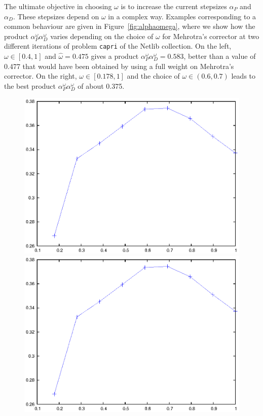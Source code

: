 The ultimate objective in choosing $\omega$ is to increase 
the current stepsizes 
$\alpha_P$ and $\alpha_D$. These stepsizes depend on $\omega$ 
in a complex way. Examples corresponding to a common behaviour 
are given in Figure~\ref{fig:alphaomega}, where we show how the
product $\alpha^\omega_P\alpha^\omega_D$
varies depending on the choice of $\omega$ for Mehrotra's corrector at 
two different iterations of problem {\tt capri} of the Netlib collection.
On the left, $\omega \in [0.4, 1]$ and $\hat\omega=0.475$ gives a product
$\alpha^\omega_P\alpha^\omega_D=0.583$, 
better than a value of 0.477 that would have
been obtained by using a full weight on Mehrotra's corrector.
On the right, $\omega \in [0.178, 1]$ and the choice of 
$\omega \in (0.6, 0.7)$ leads to the best 
product $\alpha^\omega_P\alpha^\omega_D$ of about 0.375.
%
\begin{figure}[ht]
\centering
  \begin{minipage}[t]{0.49\textwidth}
  \includegraphics[width=\textwidth]{figures/alphaomega-1.eps}
  \end{minipage} 
  \hfill
  \begin{minipage}[t]{0.49\textwidth}
  \includegraphics[width=\textwidth]{figures/alphaomega-2.eps}

\end{minipage}
\end{figure}

